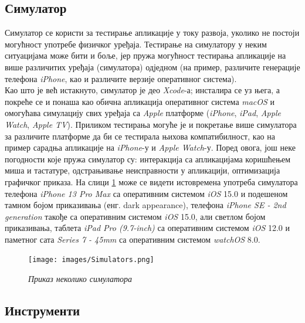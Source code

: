 \documentclass[12pt,oneside]{memoir}
\begin{document}
\subsection{Симулатор}
\indent Симулатор се користи за тестирање апликације у току развоја, уколико не постоји могућност употребе физичког уређаја. Тестирање на симулатору у неким ситуацијама може бити и боље, јер пружа могућност тестирања апликације на више различитих уређаја (симулатора) одједном (на пример, различите генерације телефона \textit{iPhone}, као и различите верзије оперативног система). 
\\
\indent Као што је већ истакнуто, симулатор је део \textit{Xcode}-а; инсталира се уз њега, а покреће се и понаша као обична апликација оперативног система \textit{macOS} и омогућава симулацију свих уређаја са \textit{Apple} платформе (\textit{iPhone}, \textit{iPad}, \textit{Apple Watch}, \textit{Apple TV}). Приликом тестирања могуће је и покретање више симулатора за различите платформе да би се тестирала њихова компатибилност, као на пример сарадња апликације на \textit{iPhone}-у и \textit{Apple Watch}-у. 
Поред овога, још неке погодности које пружа симулатор су: интеракција са апликацијама коришћењем миша и тастатуре, одстрањивање неисправности у апликацији, оптимизација графичког приказа. На слици \ref{slika:simulatori} може се видети истовремена употреба симулатора телефона \textit{iPhone 13 Pro Max} са оперативним системом \textit{iOS} 15.0 и подешеном тамном бојом приказивања (енг. dark appearance), телефона \textit{iPhone SE - 2nd generation} такође са оперативним системом \textit{iOS} 15.0, али светлом бојом приказивања, таблета \textit{iPad Pro (9.7-inch)} са оперативним системом \textit{iOS} 12.0 и паметног сата \textit{Series 7 - 45mm} са оперативним системом \textit{watchOS} 8.0.

\begin{figure}[H]
\texttt{[image: images/Simulators.png]}
\centering
\caption{\textit{Приказ неколико симулатора}}
\label{slika:simulatori}
\end{figure}

\subsection{Инструменти}
\end{document}
